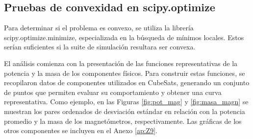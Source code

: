 \subsection{Pruebas de convexidad en scipy.optimize}

Para determinar si el problema es convexo, se utiliza la librería scipy.optimize.minimize, especializada en la búsqueda de mínimos locales. Estos serían suficientes si la suite de simulación resultara ser convexa.

El análisis comienza con la presentación de las funciones representativas de la potencia y la masa de los componentes físicos. Para construir estas funciones, se recopilaron datos de componentes utilizados en CubeSats, generando un conjunto de puntos que permiten evaluar su comportamiento y obtener una curva representativa. Como ejemplo, en las Figuras \ref{fig:pot_mag} y \ref{fig:masa_magn} se muestran los pares ordenados de desviación estándar en relación con la potencia promedio y la masa de los magnetómetros, respectivamente. Las gráficas de los otros componentes se incluyen en el Anexo \ref{ap:Z9}.

